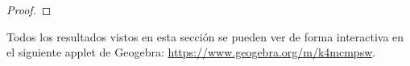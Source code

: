 \begin{proof}
\begin{comment}
        \left(1-\frac{\lm_a}{\left\|\vec{ac}\right\|}-\frac{\lm_a}{\left\|\vec{ab}\right\|} - \frac{\lm_b}{\left\|\vec{ba}\right\|}\right)\vec{ca} &=
        \left(1-\frac{\lm_b}{\left\|\vec{bc}\right\|}-\frac{\lm_b}{\left\|\vec{ba}\right\|} - \frac{\lm_a}{\left\|\vec{ab}\right\|}\right)\vec{cb}
    \end{align*}
    Como $\left\{\vec{ca},\vec{cb}\right\}$ son linealmente independientes, entonces:
    \begin{equation*}
        \left\{
            \begin{array}{l}
                \dfrac{\lm_a}{\left\|\vec{ac}\right\|}+\dfrac{\lm_a}{\left\|\vec{ab}\right\|} + \dfrac{\lm_b}{\left\|\vec{ba}\right\|} = 1 \\ \\
                \dfrac{\lm_b}{\left\|\vec{bc}\right\|}+\dfrac{\lm_b}{\left\|\vec{ba}\right\|} + \dfrac{\lm_a}{\left\|\vec{ab}\right\|} = 1
                \Longrightarrow \lm_a = \left\|\vec{ab}\right\| - \dfrac{\left\|\vec{ab}\right\|}{\left\|\vec{bc}\right\|}\lm_b-\lm_b
            \end{array}
        \right.
    \end{equation*}
    \end{comment}
\end{proof}

\begin{observacion}
    Todos los resultados vistos en esta sección se pueden ver de forma interactiva en el siguiente applet de Geogebra: \href{https://www.geogebra.org/m/k4mcmpsw}{https://www.geogebra.org/m/k4mcmpsw}.
\end{observacion}


